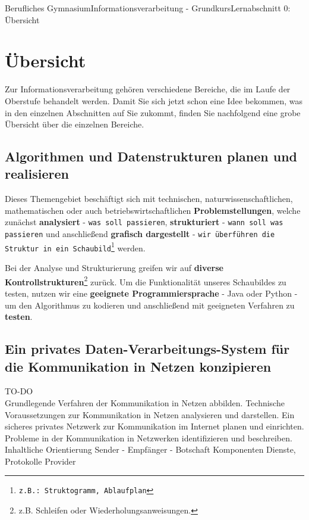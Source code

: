 \documentclass[11pt,oneside,openany,headings=optiontotoc,11pt,numbers=noenddot]{article}
\begin{document}
	\begin{worksheet}{Berufliches Gymnasium}{Informationsverarbeitung - Grundkurs}{Lernabschnitt 0: Übersicht}
		\setlength{\columnseprule}{0pt}
		\setcounter{section}{0}
		\section{Übersicht}
		Zur Informationsverarbeitung gehören verschiedene Bereiche, die im Laufe der Oberstufe behandelt werden. Damit Sie sich jetzt schon eine Idee bekommen, was in den einzelnen Abschnitten auf Sie zukommt, finden Sie nachfolgend eine grobe Übersicht über die einzelnen Bereiche.
		\subsection{Algorithmen und Datenstrukturen planen und realisieren}
		Dieses Themengebiet beschäftigt sich mit technischen, naturwissenschaftlichen, mathematischen oder auch betriebswirtschaftlichen \textbf{Problemstellungen}, welche zunächst \textbf{analysiert} - \texttt{was soll passieren}, \textbf{strukturiert} - \texttt{wann soll was passieren} und anschließend \textbf{grafisch dargestellt} - \texttt{wir überführen die Struktur in ein Schaubild\footnote{z.B.: Struktogramm, Ablaufplan}} werden.\\
		\par\noindent
		Bei der Analyse und Strukturierung greifen wir auf \textbf{diverse Kontrollstrukturen}\footnote{z.B. Schleifen oder Wiederholungsanweisungen.} zurück. Um die Funktionalität unseres Schaubildes zu testen, nutzen wir eine \textbf{geeignete Programmiersprache} - Java oder Python - um den Algorithmus zu kodieren und anschließend mit geeigneten Verfahren zu \textbf{testen}.
		\subsection{Ein privates Daten-Verarbeitungs-System für die Kommunikation in Netzen konzipieren}
		\LARGE{TO-DO}\normalsize\\
		Grundlegende Verfahren der Kommunikation in Netzen abbilden.
		Technische Voraussetzungen zur Kommunikation in Netzen analysieren und darstellen.
		Ein sicheres privates Netzwerk zur Kommunikation im Internet planen und einrichten.
		Probleme in der Kommunikation in Netzwerken identifizieren und beschreiben.
		Inhaltliche Orientierung
		Sender - Empfänger - Botschaft
		Komponenten
		Dienste, Protokolle
		Provider

\end{worksheet}
\end{document}
